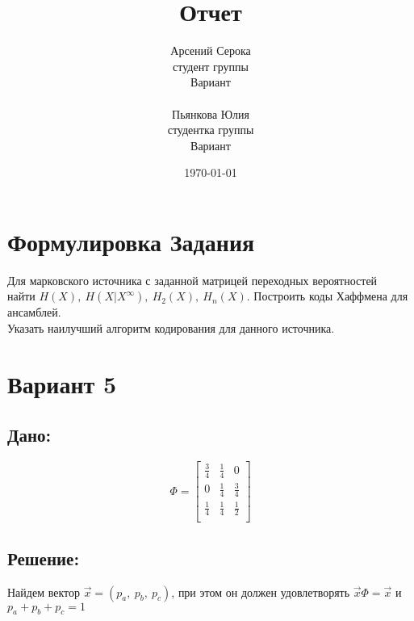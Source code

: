 \documentclass{article}
\title{Отчет}
\author{Арсений Серока\\ студент группы \textnumero 4538\\Вариант \textnumero 5\\\\Пьянкова Юлия\\ студентка группы \textnumero 4539\\Вариант \textnumero 12}
\date{\today}
\begin{document}
\maketitle

\section{Формулировка Задания}
\def \n {$n = [1..4]$}
\def \Hn {$H_n(x)$}
Для марковского источника с заданной матрицей переходных вероятностей\\
найти $H(X),\ H(X|X^{\infty}),\ H_2(X),\ H_n(X)$. Построить коды Хаффмена для ансамблей.\\
Указать наилучший алгоритм кодирования для данного источника.
\newpage
\section{Вариант 5}
\subsection{Дано:}
\[
   \Phi =
  \left[ {\begin{array}{ccc}
   \frac{3}{4} & \frac{1}{4} & 0 \\[1em]
   0 & \frac{1}{4} & \frac{3}{4} \\[1em]
   \frac{1}{4} & \frac{1}{4} & \frac{1}{2} \\
  \end{array} } \right]
\]
\subsection{Решение:}
Найдем вектор $\overrightarrow{x} = (p_a,\ p_b,\ p_c)$, при этом он должен удовлетворять $\overrightarrow{x}\Phi = \overrightarrow{x}$ и $p_a + p_b + p_c = 1$
\end{document}
